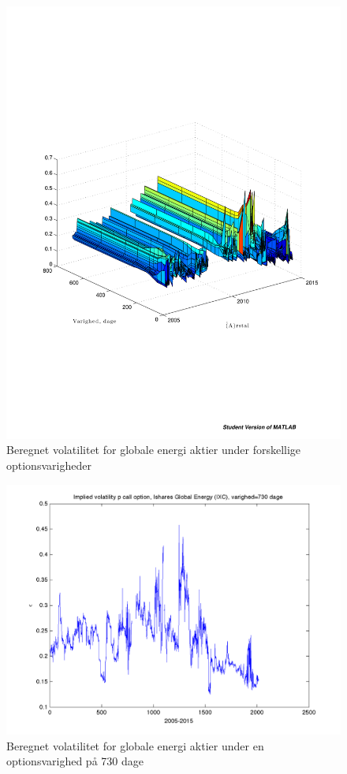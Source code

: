 \documentclass{article}
\begin{document}
\begin{figure}
\includegraphics[scale=0.8]{../matlab/figs/implied_vol_curve}
\caption{Beregnet volatilitet for globale energi aktier under forskellige optionsvarigheder}
\label{fig:option_vol_curve}
\end{figure}

\begin{figure}
\includegraphics[scale=0.8]{../matlab/figs/implied_vol_730}
\caption{Beregnet volatilitet for globale energi aktier under en optionsvarighed på 730 dage}
\label{fig:option_vol_730}
\end{figure}
\end{document}
